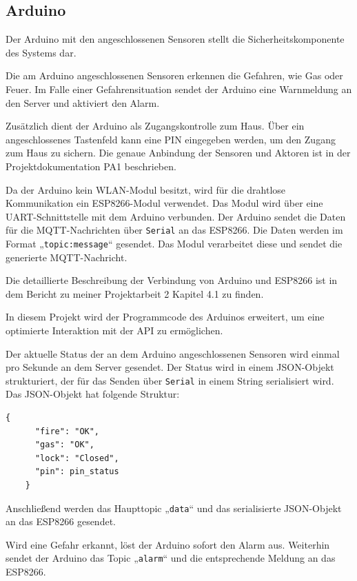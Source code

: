 \documentclass[12pt, letterpaper]{article}
\begin{document}
  \subsection{Arduino}  
  \par Der Arduino mit den angeschlossenen Sensoren stellt die Sicherheitskomponente des Systems dar.
  \par Die am Arduino angeschlossenen Sensoren erkennen die Gefahren, wie Gas oder Feuer. Im Falle einer Gefahrensituation sendet der Arduino eine Warnmeldung an den Server und aktiviert den Alarm.
  \par Zusätzlich dient der Arduino als Zugangskontrolle zum Haus. Über ein angeschlossenes Tastenfeld kann eine PIN eingegeben werden, um den Zugang zum Haus zu sichern. Die genaue Anbindung der Sensoren und Aktoren ist in der Projektdokumentation PA1 \cite{pa1} beschrieben.
  \par Da der Arduino kein WLAN-Modul besitzt, wird für die drahtlose Kommunikation ein ESP8266-Modul verwendet. Das Modul wird über eine UART-Schnittstelle mit dem Arduino verbunden. Der Arduino sendet die Daten für die MQTT-Nachrichten über \texttt{Serial} an das ESP8266. Die Daten werden im Format „\texttt{topic:message}“ gesendet. Das Modul verarbeitet diese und sendet die generierte MQTT-Nachricht.
  \par Die detaillierte Beschreibung der Verbindung von Arduino und ESP8266 ist in dem Bericht zu meiner Projektarbeit 2 \cite{pa2} Kapitel 4.1 zu finden.
  \par In diesem Projekt wird der Programmcode des Arduinos erweitert, um eine optimierte Interaktion mit der API zu ermöglichen.
  \par Der aktuelle Status der an dem Arduino angeschlossenen Sensoren wird einmal pro Sekunde an dem Server gesendet. Der Status wird in einem JSON-Objekt strukturiert, der für das Senden über \texttt{Serial} in einem String serialisiert wird. Das JSON-Objekt hat folgende Struktur:
  \begin{Verbatim}[frame=single]
    {
      "fire": "OK",
      "gas": "OK",
      "lock": "Closed",
      "pin": pin_status   
    }
  \end{Verbatim}
  \par Anschließend werden das Haupttopic „\texttt{data}“ und das serialisierte JSON-Objekt an das ESP8266 gesendet.
   \par Wird eine Gefahr erkannt, löst der Arduino sofort den Alarm aus. Weiterhin sendet der Arduino das Topic „\texttt{alarm}“ und die entsprechende Meldung an das ESP8266. 
\end{document}
